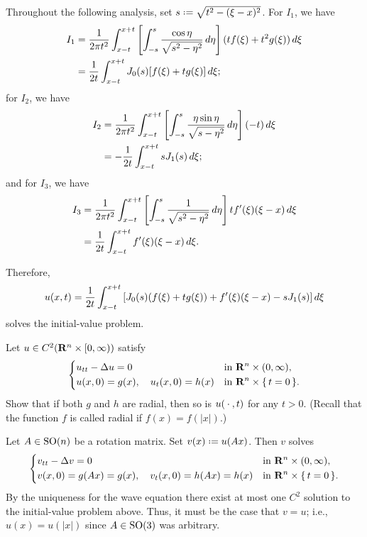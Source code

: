 \begin{solution*}
  Throughout the following analysis, set \(s\defeq\sqrt{t^2-(\xi-x)^2}\).
  For \(I_1\), we have
  \begin{align*}
    I_1
    &=\frac{1}{2\pi t^2}\int_{x-t}^{x+t}%
      \left[%
      \int_{-s}^s\frac{\cos\eta}{\sqrt{s^2-\eta^2}}\diff\eta%
      \right]%
      (tf(\xi)+t^2g(\xi))\diff\xi\\
    &=\frac{1}{2t}\int_{x-t}^{x+t} J_0(s)[f(\xi)+tg(\xi)]\diff\xi;
  \end{align*}
  for \(I_2\), we have
  \begin{align*}
    I_2
    &=\frac{1}{2\pi t^2}%
      \int_{x-t}^{x+t}%
      \left[%
      \int_{-s}^s\frac{\eta\sin\eta}{\sqrt{s-\eta^2}}\diff\eta%
      \right](-t)\diff\xi\\
    &=-\frac{1}{2t}\int_{x-t}^{x+t} sJ_1(s)\diff\xi;
  \end{align*}
  and for \(I_3\), we have
  \begin{align*}
    I_3
    &=\frac{1}{2\pi t^2}%
      \int_{x-t}^{x+t}%
      \left[%
      \int_{-s}^s%
      \frac{1}{\sqrt{s^2-\eta^2}}%
      \diff\eta\right] tf'(\xi)(\xi-x)\diff\xi\\
    &=\frac{1}{2t}\int_{x-t}^{x+t} f'(\xi)(\xi-x)\diff\xi.
  \end{align*}

  Therefore,
  \[
    u(x,t)=\frac{1}{2t}\int_{x-t}^{x+t}
    \left[
      J_0(s)(f(\xi)+tg(\xi))
      +
      f'(\xi)(\xi-x)
      -sJ_1(s)
    \right]\mathop{}\!d\xi
  \]
  solves the initial-value problem.
\end{solution*}

\begin{problem}
  Let \(u\in C^2(\mathbf{R}^n\times[0,\infty))\) satisfy
  \[
    \left\{
      \begin{aligned}
        &u_{tt}-\Delta u=0&&\text{in \(\mathbf{R}^n\times(0,\infty),\)}\\
        &u(x,0)=g(x),\quad u_t(x,0)=h(x)&&\text{in \(\mathbf{R}^n\times\{\,t=0\,\}\).}
      \end{aligned}
    \right.
  \]
  Show that if both \(g\) and \(h\) are radial, then so is \(u({}\cdot{},t)\)
  for any \(t>0\). (Recall that the function \(f\) is called radial if
  \(f(x)=f(|x|)\).)
\end{problem}
\begin{solution*}
  Let \(A\in\operatorname{SO}(n)\) be a rotation matrix. Set \(v(x)\defeq u(Ax)\). Then
  \(v\) solves
  \[
    \left\{
      \begin{aligned}
        &v_{tt}-\Delta v=0&&\text{in \(\mathbf{R}^n\times(0,\infty),\)}\\
        &v(x,0)=g(Ax)=g(x),\quad v_t(x,0)=h(Ax)=h(x)&&\text{in
          \(\mathbf{R}^n\times\{\,t=0\,\}\).}
      \end{aligned}
    \right.
  \]
  By the uniqueness for the wave equation there exist at most one \(C^2\)
  solution to the initial-value problem above. Thus, it must be the case
  that \(v=u\); i.e., \(u(x)=u(|x|)\) since \(A\in\operatorname{SO}(3)\) was arbitrary.
\end{solution*}

